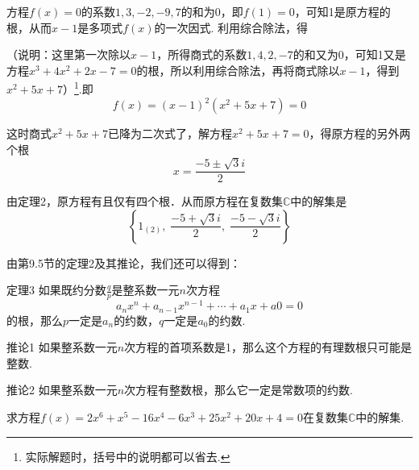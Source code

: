\begin{solution}
    方程$f(x)=0$的系数$1,3,-2,-9,7$的和为0，即$f(1)=0$，可知1是原方程的根，从而$x-1$是多项式$f(x)$的一次因式. 利用综合除法，得
\begin{center}
\end{center}

（说明：这里第一次除以$x-1$，所得商式的系数$1,4,2,-7$的和又为0，可知1又是方程$x^3+4x^2+2x-7=0$的根，所以利用综合除法，再将商式除以$x-1$，得到$x^2+5x+7$）\footnote{实际解题时，括号中的说明都可以省去.}.即
\[f(x)=(x-1)^2(x^2+5x+7)=0\]

这时商式$x^2+5x+7$已降为二次式了，解方程$x^2+5x+7=0$，得原方程的另外两个根
\[x=\frac{-5\pm\sqrt{3}i}{2}\]

由定理2，原方程有且仅有四个根．从而原方程在复数集$\mathbb{C}$中的解集是
\[\left\{1_{(2)}, \;\frac{-5+\sqrt{3}i}{2},\; \frac{-5-\sqrt{3}i}{2} \right\}\]
\end{solution}

由第9.5节的定理2及其推论，我们还可以得到：

\begin{thm}{定理3}
    如果既约分数$\frac{q}{p}$是整系数一元$n$次方程
\[a_nx^n+a_{n-1}x^{n-1}+\cdots +a_1x+a0=0\]
的根，那么$p$一定是$a_n$的约数，$q$一定是$a_0$的约数.
\end{thm}

\begin{thm}
 {推论1} 如果整系数一元$n$次方程的首项系数是1，那么这个方程的有理数根只可能是整数.   
\end{thm}

\begin{thm}
{推论2} 如果整系数一元$n$次方程有整数根，那么它一定是常数项的约数.    
\end{thm}

\begin{example}
    求方程$f(x)=2x^6+x^5-16x^4-6x^3+25x^2+20x+4=0$在复数集$\mathbb{C}$中的解集.
\end{example}

